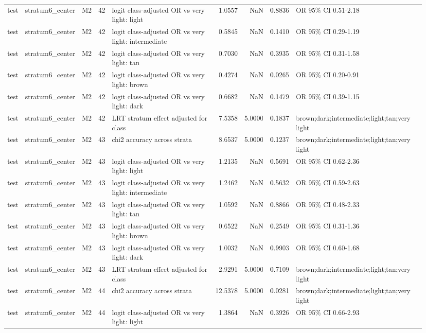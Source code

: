 \begin{tabular}{lllrlrrrl}
test & stratum6\_center & M2 & 42 & logit class-adjusted OR vs very light: light & 1.0557 & NaN & 0.8836 & OR 95\% CI 0.51-2.18 \\
test & stratum6\_center & M2 & 42 & logit class-adjusted OR vs very light: intermediate & 0.5845 & NaN & 0.1410 & OR 95\% CI 0.29-1.19 \\
test & stratum6\_center & M2 & 42 & logit class-adjusted OR vs very light: tan & 0.7030 & NaN & 0.3935 & OR 95\% CI 0.31-1.58 \\
test & stratum6\_center & M2 & 42 & logit class-adjusted OR vs very light: brown & 0.4274 & NaN & 0.0265 & OR 95\% CI 0.20-0.91 \\
test & stratum6\_center & M2 & 42 & logit class-adjusted OR vs very light: dark & 0.6682 & NaN & 0.1479 & OR 95\% CI 0.39-1.15 \\
test & stratum6\_center & M2 & 42 & LRT stratum effect adjusted for class & 7.5358 & 5.0000 & 0.1837 & brown;dark;intermediate;light;tan;very light \\
test & stratum6\_center & M2 & 43 & chi2 accuracy across strata & 8.6537 & 5.0000 & 0.1237 & brown;dark;intermediate;light;tan;very light \\
test & stratum6\_center & M2 & 43 & logit class-adjusted OR vs very light: light & 1.2135 & NaN & 0.5691 & OR 95\% CI 0.62-2.36 \\
test & stratum6\_center & M2 & 43 & logit class-adjusted OR vs very light: intermediate & 1.2462 & NaN & 0.5632 & OR 95\% CI 0.59-2.63 \\
test & stratum6\_center & M2 & 43 & logit class-adjusted OR vs very light: tan & 1.0592 & NaN & 0.8866 & OR 95\% CI 0.48-2.33 \\
test & stratum6\_center & M2 & 43 & logit class-adjusted OR vs very light: brown & 0.6522 & NaN & 0.2549 & OR 95\% CI 0.31-1.36 \\
test & stratum6\_center & M2 & 43 & logit class-adjusted OR vs very light: dark & 1.0032 & NaN & 0.9903 & OR 95\% CI 0.60-1.68 \\
test & stratum6\_center & M2 & 43 & LRT stratum effect adjusted for class & 2.9291 & 5.0000 & 0.7109 & brown;dark;intermediate;light;tan;very light \\
test & stratum6\_center & M2 & 44 & chi2 accuracy across strata & 12.5378 & 5.0000 & 0.0281 & brown;dark;intermediate;light;tan;very light \\
test & stratum6\_center & M2 & 44 & logit class-adjusted OR vs very light: light & 1.3864 & NaN & 0.3926 & OR 95\% CI 0.66-2.93 \\

\end{tabular}

